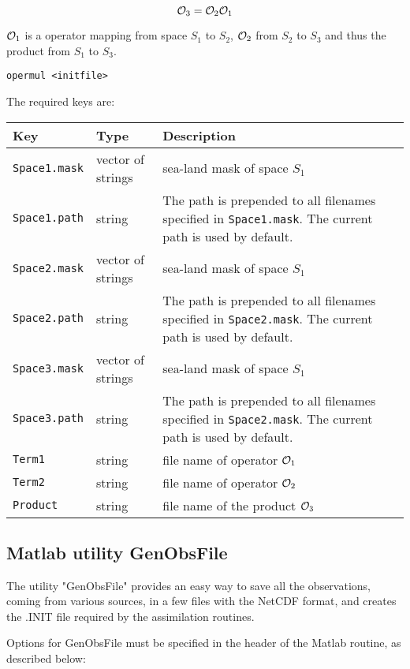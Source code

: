 \documentclass[a4paper,12pt]{article}
\newcommand{\code}{\texttt}
\newenvironment{keytabular}{\begin{tabular}{|p{0.3\textwidth}|p{0.2\textwidth}|p{0.5\textwidth}|} \hline Key & Type & Description \\ \hline \hline }{\end{tabular}}
\begin{document}
\begin{equation}
{\cal O}_3 = {\cal O}_2 {\cal O}_1  
\end{equation}

${\cal O}_1$ is a operator mapping from space $S_1$ to $S_2$, ${\cal O}_2$ from $S_2$ to $S_3$ and thus the product from  $S_1$ to $S_3$.
 
\begin{verbatim}
opermul <initfile>
\end{verbatim}

The required keys are: \\

\begin{keytabular}
\code{Space1.mask} & vector of strings &  sea-land mask of space $S_1$ 
\\
\code{Space1.path} & string & The path is prepended to all filenames
specified in \code{Space1.mask}. The current path is used by default.
\\
\code{Space2.mask} & vector of strings &  sea-land mask of space $S_1$ 
\\
\code{Space2.path} & string & The path is prepended to all filenames
specified in \code{Space2.mask}. The current path is used by default.
\\
\code{Space3.mask} & vector of strings &  sea-land mask of space $S_1$ 
\\
\code{Space3.path} & string & The path is prepended to all filenames
specified in \code{Space2.mask}. The current path is used by default.
\\
\code{Term1} & string & file name of operator ${\cal O}_1$
\\
\code{Term2} & string & file name of operator ${\cal O}_2$
\\
\code{Product} & string & file name of the product ${\cal O}_3$
\\
\hline
\end{keytabular}

\subsection{Matlab utility GenObsFile}

The utility "GenObsFile" provides an easy way to save all the observations, coming from various sources, in a few files with the NetCDF format, and creates the .INIT file required by the assimilation routines.

Options for GenObsFile must be specified in the header of the Matlab routine, as described below:
\end{document}
